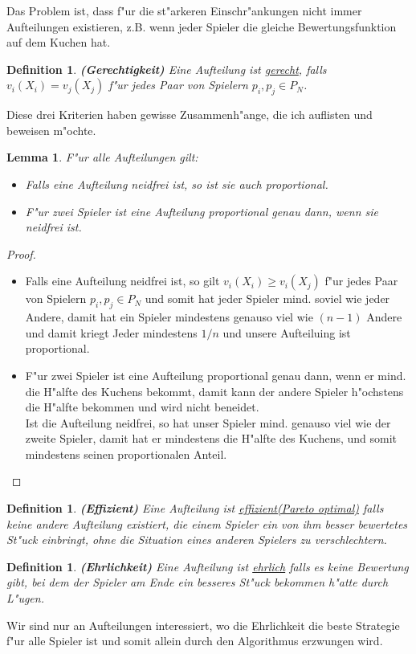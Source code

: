 \documentclass[11pt, a4paper, twoside]{article}
\newtheorem{defi}[satz]{Definition}
\newtheorem{lem}[satz]{Lemma}
\numberwithin{equation}{section}
\begin{document}
Das Problem ist, dass f"ur die st"arkeren Einschr"ankungen nicht immer Aufteilungen existieren, z.B. wenn jeder Spieler die gleiche Bewertungsfunktion auf dem Kuchen hat. 
\begin{defi}{\textbf{(Gerechtigkeit)}}
\newline Eine Aufteilung ist \underline{gerecht}, falls $v_i(X_i) = v_j(X_j)$ f"ur jedes Paar von Spielern $p_i, p_j \in P_N$.
\end{defi} 
Diese drei Kriterien haben gewisse Zusammenh"ange, die ich auflisten und beweisen m"ochte.
\begin{lem}
F"ur alle Aufteilungen gilt:
\begin{itemize}
\item Falls eine Aufteilung neidfrei ist, so ist sie auch proportional.
\item F"ur zwei Spieler ist eine Aufteilung proportional genau dann, wenn sie neidfrei ist.
\end{itemize}
\end{lem}
\begin{proof}
\begin{itemize}
\item Falls eine Aufteilung neidfrei ist, so gilt $v_i(X_i) \geq v_i(X_j)$ f"ur jedes Paar von Spielern $p_i, p_j \in P_N$ und somit hat jeder Spieler mind. soviel wie jeder Andere, damit hat ein Spieler mindestens genauso viel wie $(n-1)$ Andere und damit kriegt Jeder mindestens $1/n$ und unsere Aufteiluing ist proportional.
\item F"ur zwei Spieler ist eine Aufteilung proportional genau dann, wenn er mind. die H"alfte des Kuchens bekommt, damit kann der andere Spieler h"ochstens die H"alfte bekommen und wird nicht beneidet.\\ Ist die Aufteilung neidfrei, so hat unser Spieler mind. genauso viel wie der zweite Spieler, damit hat er mindestens die H"alfte des Kuchens, und somit mindestens seinen proportionalen Anteil. 
\end{itemize}
\end{proof}
\begin{defi}{\textbf{(Effizient)}}
\newline Eine Aufteilung ist \underline{effizient(Pareto optimal)} falls keine andere Aufteilung existiert, die einem Spieler ein von ihm besser bewertetes St"uck einbringt, ohne die Situation eines anderen Spielers zu verschlechtern. 
\end{defi}
\begin{defi}{\textbf{(Ehrlichkeit)}}
\newline Eine Aufteilung ist \underline{ehrlich} falls es keine Bewertung gibt, bei dem der Spieler am Ende ein besseres St"uck bekommen h"atte durch L"ugen. 
\end{defi} 
Wir sind nur an Aufteilungen interessiert, wo die Ehrlichkeit die beste Strategie f"ur alle Spieler ist und somit allein durch den Algorithmus erzwungen wird.  
\end{document}
